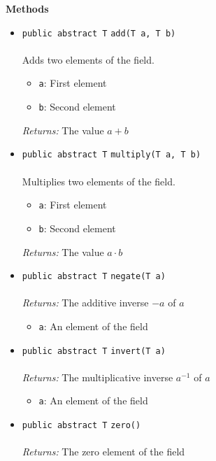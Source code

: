 \textbf{\sffamily Methods}
\begin{itemize}
\item \lstinline|public abstract T| \lstinline|add|\lstinline|(T a, T b)|\\ \\[-0.6em]
Adds two elements of the field.
\begin{itemize}
\item \lstinline|a|: First element
\item \lstinline|b|: Second element
\end{itemize}

\emph{Returns:} The value $a + b$

\item \lstinline|public abstract T| \lstinline|multiply|\lstinline|(T a, T b)|\\ \\[-0.6em]
Multiplies two elements of the field.
\begin{itemize}
\item \lstinline|a|: First element
\item \lstinline|b|: Second element
\end{itemize}

\emph{Returns:} The value $a \cdot b$

\item \lstinline|public abstract T| \lstinline|negate|\lstinline|(T a)|\\ \\[-0.6em]
\emph{Returns:} The additive inverse $-a$ of $a$
\begin{itemize}
\item \lstinline|a|: An element of the field
\end{itemize}



\item \lstinline|public abstract T| \lstinline|invert|\lstinline|(T a)|\\ \\[-0.6em]
\emph{Returns:} The multiplicative inverse $a^{-1}$ of $a$
\begin{itemize}
\item \lstinline|a|: An element of the field
\end{itemize}



\item \lstinline|public abstract T| \lstinline|zero|\lstinline|()|\\ \\[-0.6em]
\emph{Returns:} The zero element of the field




\end{itemize}
